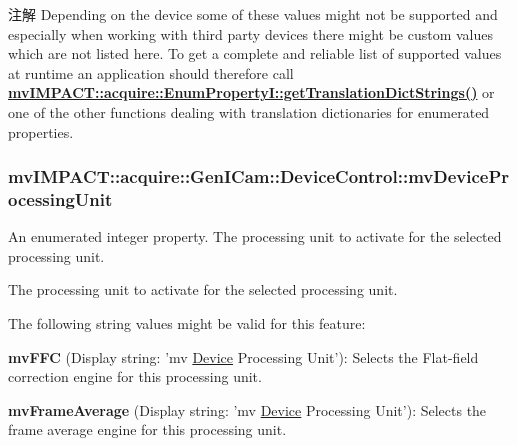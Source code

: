 \begin{DoxyNote}{注解}
Depending on the device some of these values might not be supported and especially when working with third party devices there might be custom values which are not listed here. To get a complete and reliable list of supported values at runtime an application should therefore call {\bfseries \hyperlink{classmv_i_m_p_a_c_t_1_1acquire_1_1_enum_property_i_a0ba6ccbf5ee69784d5d0b537924d26b6}{mv\+I\+M\+P\+A\+C\+T\+::acquire\+::\+Enum\+Property\+I\+::get\+Translation\+Dict\+Strings()}} or one of the other functions dealing with translation dictionaries for enumerated properties. 
\end{DoxyNote}
\hypertarget{classmv_i_m_p_a_c_t_1_1acquire_1_1_gen_i_cam_1_1_device_control_a386dbee5247630990cad0156170f837a}{
\subsubsection[{mv\+Device\+Processing\+Unit}]{ mv\+I\+M\+P\+A\+C\+T\+::acquire\+::\+Gen\+I\+Cam\+::\+Device\+Control\+::mv\+Device\+Processing\+Unit}}\label{classmv_i_m_p_a_c_t_1_1acquire_1_1_gen_i_cam_1_1_device_control_a386dbee5247630990cad0156170f837a}


An enumerated integer property. The processing unit to activate for the selected processing unit. 

The processing unit to activate for the selected processing unit.

The following string values might be valid for this feature\+:
\begin{DoxyItemize}
\item {\bfseries mv\+F\+F\+C} (Display string\+: 'mv \hyperlink{classmv_i_m_p_a_c_t_1_1acquire_1_1_device}{Device} Processing Unit')\+: Selects the Flat-\/field correction engine for this processing unit.
\item {\bfseries mv\+Frame\+Average} (Display string\+: 'mv \hyperlink{classmv_i_m_p_a_c_t_1_1acquire_1_1_device}{Device} Processing Unit')\+: Selects the frame average engine for this processing unit.
\end{DoxyItemize}

